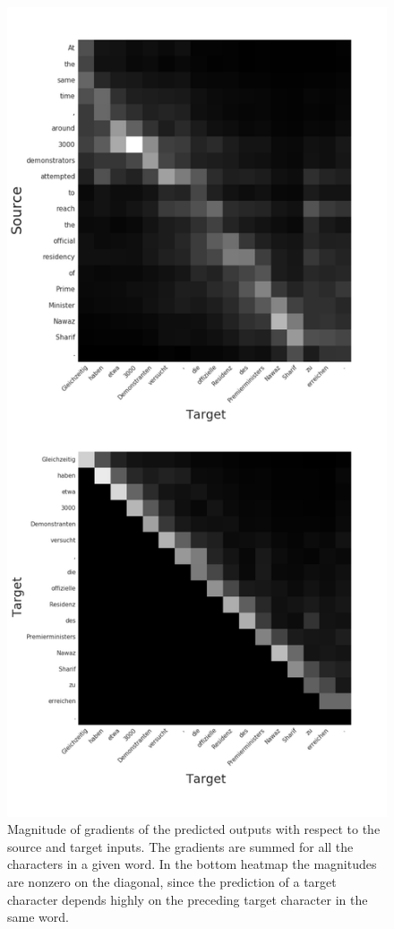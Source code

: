 \documentclass{article}
\begin{document}
\begin{figure}
\centering
\includegraphics[width=1\linewidth, trim={0 0 0 2.7cm},clip]{demonstration_heatmap}
\vspace{-0.9cm}
\caption{Magnitude of gradients of the predicted outputs with respect to the source and target inputs. The gradients are summed for all the characters in a given word. In the bottom heatmap the magnitudes are nonzero on the diagonal, since the prediction of a target character depends highly on the  preceding target character in the same word.}
\label{fig:gradheatmaps}
\end{figure}
\end{document}
